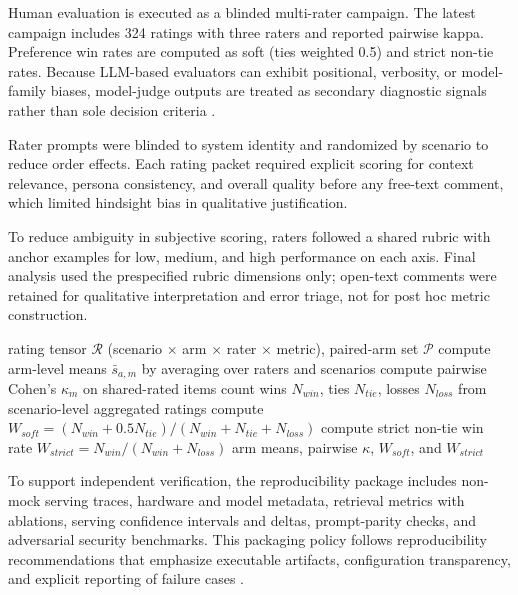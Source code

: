 ﻿\documentclass[a4paper,12pt]{article}
\begin{document}
Human evaluation is executed as a blinded multi-rater campaign. The latest campaign includes 324 ratings with three raters and reported pairwise kappa. Preference win rates are computed as soft (ties weighted 0.5) and strict non-tie rates. Because LLM-based evaluators can exhibit positional, verbosity, or model-family biases, model-judge outputs are treated as secondary diagnostic signals rather than sole decision criteria \cite{Liu2023GEval}.

Rater prompts were blinded to system identity and randomized by scenario to reduce order effects. Each rating packet required explicit scoring for context relevance, persona consistency, and overall quality before any free-text comment, which limited hindsight bias in qualitative justification.

To reduce ambiguity in subjective scoring, raters followed a shared rubric with anchor examples for low, medium, and high performance on each axis. Final analysis used the prespecified rubric dimensions only; open-text comments were retained for qualitative interpretation and error triage, not for post hoc metric construction.

\begin{algorithm}[H]
\caption{Human-rating aggregation and agreement computation}
\begin{algorithmic}[1]
\Require rating tensor \(\mathcal{R}\) (scenario \(\times\) arm \(\times\) rater \(\times\) metric), paired-arm set \(\mathcal{P}\)
  \State compute arm-level means \(\bar{s}_{a,m}\) by averaging over raters and scenarios
  \State compute pairwise Cohen's \(\kappa_m\) on shared-rated items
\EndFor
{}
  \State count wins \(N_{win}\), ties \(N_{tie}\), losses \(N_{loss}\) from scenario-level aggregated ratings
  \State compute \(W_{soft}=(N_{win}+0.5N_{tie})/(N_{win}+N_{tie}+N_{loss})\)
  \State compute strict non-tie win rate \(W_{strict}=N_{win}/(N_{win}+N_{loss})\)
\EndFor
\State \Return arm means, pairwise \(\kappa\), \(W_{soft}\), and \(W_{strict}\)
\end{algorithmic}
\end{algorithm}

To support independent verification, the reproducibility package includes non-mock serving traces, hardware and model metadata, retrieval metrics with ablations, serving confidence intervals and deltas, prompt-parity checks, and adversarial security benchmarks. This packaging policy follows reproducibility recommendations that emphasize executable artifacts, configuration transparency, and explicit reporting of failure cases \cite{Pineau2021Reproducibility}.
\end{document}
